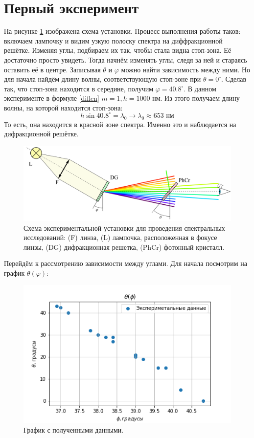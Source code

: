\documentclass[a4paper, 12pt]{article}
\renewcommand{\phi}{\varphi} %
\begin{document}
	\section*{Первый эксперимент}
	На рисунке \ref{fig:3} изображена схема установки. Процесс выполнения работы таков: включаем лампочку и видим узкую полоску спектра на диффракционной решётке. Изменяя углы, подбираем их так, чтобы стала видна стоп-зона. Её достаточно просто увидеть. Тогда начнём изменять углы, следя за ней и стараясь оставить её в центре. Записывая $\theta$ и $\phi$ можно найти зависимость между ними. Но для начала найдём длину волны, соответствующую стоп-зоне при $\theta =  0^{\circ}$. Сделав так, что стоп-зона находится в середине, получим $\phi = 40.8^{\circ}$. В  данном эксперименте в формуле \ref{diflen} $m = 1, h = 1000$ нм.
	Из этого получаем длину волны, на которой находится стоп-зона:
	\begin{equation}
	h\sin{40.8^{\circ}} = \lambda_0 \to \lambda_0 \approx 653 \text{ нм}
	\end{equation}
	То есть, она находится в красной зоне спектра. Именно это и наблюдается на дифракционной решётке.
	\begin{figure}[H]
		\centering
		\includegraphics[width=1\linewidth]{Sch1.png}
		\caption{Схема экспериментальной установки для проведения спектральных исследований: (F) линза, (L) лампочка, расположенная в фокусе линзы, (DG) дифракционная решетка, (PhCr) фотонный кристалл.
		}
		\label{fig:3}
	\end{figure}
	Перейдём к рассмотрению зависимости между углами. Для начала посмотрим на график $\theta(\phi)$:
	\begin{figure}[H]
		\centering
		\includegraphics[width=0.75\linewidth]{Graph1.png}
		\caption{График с полученными данными.}
		\label{fig:4}
	\end{figure}
\end{document}
